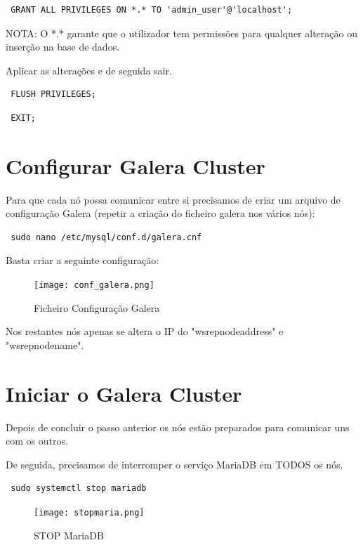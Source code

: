 \begin{verbatim} GRANT ALL PRIVILEGES ON *.* TO 'admin_user'@'localhost'; \end{verbatim}

NOTA: O *.* garante que o utilizador tem permissões para qualquer alteração ou inserção na base de dados.

Aplicar as alterações e de seguida sair.

\begin{verbatim} FLUSH PRIVILEGES; \end{verbatim}

\begin{verbatim} EXIT; \end{verbatim}

\newpage
\section{Configurar Galera Cluster}
Para que cada nó possa comunicar entre si precisamos de criar um arquivo de configuração Galera (repetir a criação do ficheiro galera nos vários nós):

\begin{verbatim} sudo nano /etc/mysql/conf.d/galera.cnf \end{verbatim}

Basta criar a seguinte configuração:
\begin{figure}[H]
\center
\texttt{[image: conf\_galera.png]}
\caption{Ficheiro Configuração Galera}
\end{figure}

Nos restantes nós apenas se altera o IP do "wsrep\textunderscore node\textunderscore address" e "wsrep\textunderscore node\textunderscore name".

\section{Iniciar o Galera Cluster}
Depois de concluir o passo anterior os nós estão preparados para comunicar uns com os outros.

De seguida, precisamos de interromper o serviço MariaDB em TODOS os nós.

\begin{verbatim} sudo systemctl stop mariadb \end{verbatim}

\begin{figure}[H]
\center
\texttt{[image: stopmaria.png]}
\caption{STOP MariaDB}
\end{figure}

